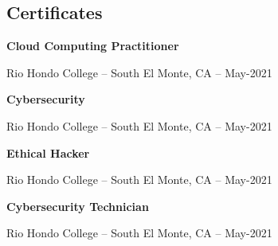 \documentclass[a4paper]{article}
\begin{document}
\vspace{20pt}
\subsection{Certificates}
\begin{minipage}{\textwidth}
\textbf{Cloud Computing Practitioner}\par
Rio Hondo College -- South El Monte, CA -- May-2021

\medskip
\textbf{Cybersecurity}\par
Rio Hondo College -- South El Monte, CA -- May-2021

\medskip
\textbf{Ethical Hacker}\par
Rio Hondo College -- South El Monte, CA -- May-2021

\medskip
\textbf{Cybersecurity Technician}\par
Rio Hondo College -- South El Monte, CA -- May-2021
\end{minipage}
\end{document}
